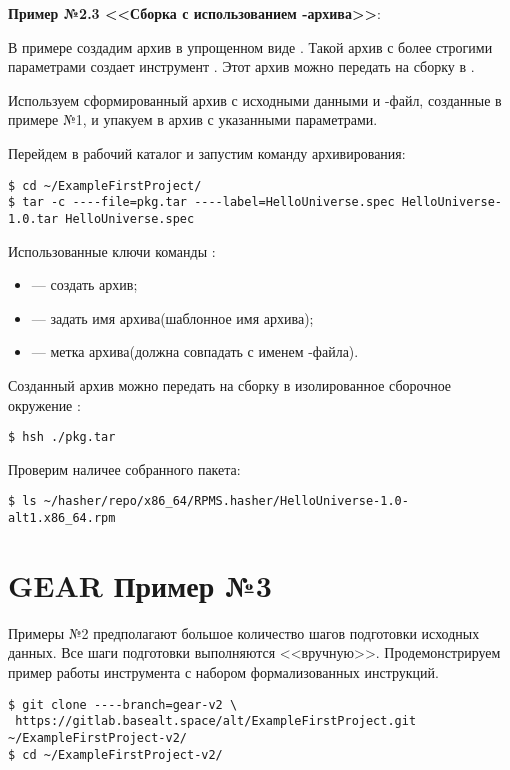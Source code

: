 \textbf{Пример №2.3 <<Сборка с использованием -архива>>}:

В примере создадим архив  в упрощенном виде . Такой архив с более строгими
параметрами создает инструмент . Этот архив можно передать на сборку в
.

Используем сформированный архив с исходными данными и -файл, созданные
в примере №1, и  упакуем в архив с указанными параметрами.

Перейдем в рабочий каталог и запустим команду архивирования:
\begin{verbatim}
$ cd ~/ExampleFirstProject/
$ tar -c ----file=pkg.tar ----label=HelloUniverse.spec HelloUniverse-1.0.tar HelloUniverse.spec
\end{verbatim}
Использованные ключи команды :
\begin{itemize}
	\item {} --- создать архив;
	\item {} --- задать имя архива(шаблонное имя архива);
	\item {} --- метка архива(должна совпадать с именем -файла).
\end{itemize}

Созданный архив можно передать на сборку в изолированное сборочное
окружение :
\begin{verbatim}
$ hsh ./pkg.tar
\end{verbatim}

Проверим наличее собранного пакета:
\begin{verbatim}
$ ls ~/hasher/repo/x86_64/RPMS.hasher/HelloUniverse-1.0-alt1.x86_64.rpm
\end{verbatim}

\section{GEAR \textbf{Пример №3}}

Примеры №2 предполагают большое количество шагов подготовки исходных данных.
Все шаги подготовки выполняются <<вручную>>. Продемонстрируем пример работы
инструмента  с набором формализованных инструкций.

\begin{verbatim}
$ git clone ----branch=gear-v2 \
 https://gitlab.basealt.space/alt/ExampleFirstProject.git ~/ExampleFirstProject-v2/
$ cd ~/ExampleFirstProject-v2/
\end{verbatim}

